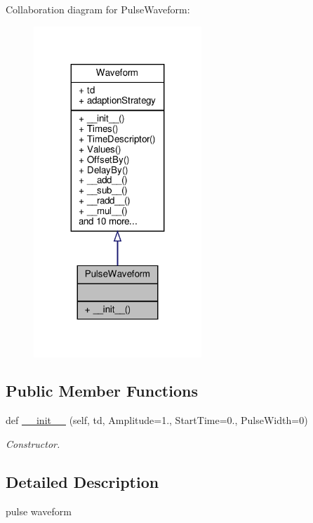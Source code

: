 Collaboration diagram for Pulse\+Waveform\+:\nopagebreak
\begin{figure}[H]
\begin{center}
\leavevmode
\includegraphics[width=179pt]{classSignalIntegrity_1_1TimeDomain_1_1Waveform_1_1PulseWaveform_1_1PulseWaveform__coll__graph}
\end{center}
\end{figure}
\subsection*{Public Member Functions}
\begin{DoxyCompactItemize}
\item 
def \hyperlink{classSignalIntegrity_1_1TimeDomain_1_1Waveform_1_1PulseWaveform_1_1PulseWaveform_a51a1fd116318537dd687d7af9bc5b8e5}{\+\_\+\+\_\+init\+\_\+\+\_\+} (self, td, Amplitude=1., Start\+Time=0., Pulse\+Width=0)
\begin{DoxyCompactList}\small\item\em Constructor. \end{DoxyCompactList}\end{DoxyCompactItemize}


\subsection{Detailed Description}
pulse waveform 

